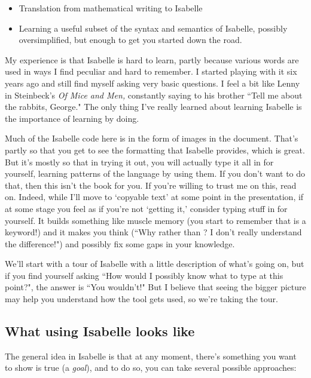 \begin{itemize}
\item Translation from mathematical writing to Isabelle

\item  Learning a useful subset of the syntax and semantics of Isabelle, possibly oversimplified, but enough to get you started down the road. 
\end{itemize}

My experience is that Isabelle is hard to learn, partly because various words are used in ways I find peculiar and hard to remember. I started playing with it six years ago and still find myself asking very basic questions. I feel a bit like Lenny in Steinbeck's \emph{Of Mice and Men,} constantly saying to his brother ``Tell me about the rabbits, George." The only thing I've really learned about learning Isabelle is the importance of learning by doing. 

Much of the Isabelle code here is in the form of images in the document. That's partly so that you get to see the formatting that Isabelle provides, which is great. But it's mostly so that in trying it out, you will actually type it all in for yourself, learning patterns of the language by using them. If you don't want to do that, then this isn't the book for you. If you're willing to trust me on this, read on. Indeed, while I'll move to `copyable text' at some point in the presentation, if at some stage you feel as if you're not `getting it,' consider typing stuff in for yourself. It builds something like muscle memory (you start to remember that  is a keyword!) and it makes you think (``Why   rather than ? I don't really understand the difference!") and possibly fix some gaps in your knowledge. 

We'll start with a tour of Isabelle with a little description of what's going on, but if you find yourself asking ``How would I possibly know what to type at this point?", the answer is ``You wouldn't!" But I believe that seeing the bigger picture may help you understand how the tool gets used, so we're taking the tour. 

\subsection{What using Isabelle looks like}

The general idea in Isabelle is that at any moment, there's something you want to show is true (a \textit{goal}), and to do so, you can take several possible approaches: 

